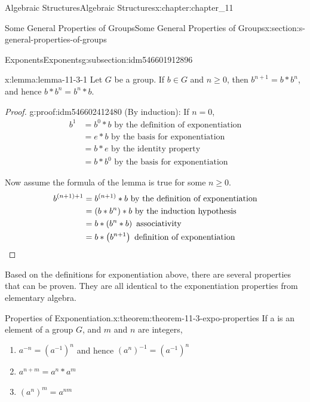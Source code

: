 \documentclass[oneside,10pt,]{book}
\newcommand{\qedhere}{\relax}
\numberwithin{equation}{section}
\begin{document}
\begin{chapterptx}{Algebraic Structures}{}{Algebraic Structures}{}{}{x:chapter:chapter_11}
\begin{sectionptx}{Some General Properties of Groups}{}{Some General Properties of Groups}{}{}{x:section:s-general-properties-of-groups}
\begin{subsectionptx}{Exponents}{}{Exponents}{}{}{g:subsection:idm546601912896}
\begin{lemma}{}{}{x:lemma:lemma-11-3-1}%
Let \(G\) be a group.  If \(b\in G\) and \(n\geq 0\), then  \(b^{n+1}=b* b^n\), and hence  \(b* b^n= b^n*b\).%
\end{lemma}
\begin{proof}{}{g:proof:idm546602412480}
(By induction):  If  \(n=0\),%
\begin{equation*}
\begin{split}
b^1 &= b^0*b \textrm{          by the definition of exponentiation}\\
& =e*b\textrm{    by the basis for exponentiation}\\
&= b * e\textrm{       by the identity property}\\
&= b * b^0\textrm{    by the basis for exponentiation}
\end{split}
\end{equation*}
%
\par
Now assume the formula of the lemma is true for some \(n\geq 0\).%
\begin{equation*}
\begin{split}
b^{(n+1)+1} &= b^{(n+1)}* b\textrm{           by the definition of exponentiation}\\
&= \left(b*b^n\right)*b\textrm{        by the induction hypothesis}\\
& = b*\left(b^n*b\right)\textrm{       associativity}\\
& = b*\left(b^{n+1}\right)\textrm{       definition of exponentiation}\\
\end{split}\qedhere
\end{equation*}
%
\end{proof}
Based on the definitions for exponentiation above, there are several properties that can be proven. They are all identical to the exponentiation properties from elementary algebra.%
\begin{theorem}{Properties of Exponentiation.}{}{x:theorem:theorem-11-3-expo-properties}%
If a is an element of a group \(G\), and \(m\) and \(n\) are integers,%
\begin{enumerate}[label=(\arabic*)]
\item{}\(a^{-n}= \left(a^{-1}\right)^n\)    and hence  \(\left(a^n\right)^{-1}= \left(a^{-1}\right)^n\)%
\item{}\(a^{n+m}= a^n*a^m\)%
\item{}\(\left(a^n\right)^m= a^{n m}\)%
\end{enumerate}
%
\end{theorem}

\end{subsectionptx}
\end{sectionptx}
\end{chapterptx}
\end{document}
